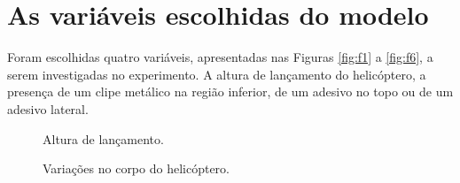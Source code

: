 \section{As variáveis escolhidas do modelo} 
\label{sec:as_variavies_escolhidas_do_modelo}

Foram escolhidas quatro variáveis, apresentadas nas Figuras \ref{fig:f1} a \ref{fig:f6}, a serem investigadas no experimento. A altura de lançamento do helicóptero, a presença de um clipe metálico na região inferior, de um adesivo no topo ou de um adesivo lateral.

\begin{figure}[h]
    \centering
    \hfill
\caption{Altura de lançamento.}
  \end{figure}

  \begin{figure}[h]
    \centering
    \hfill
    \hfill
    \hfill
  \caption{Variações no corpo do helicóptero.}
  \end{figure}  


